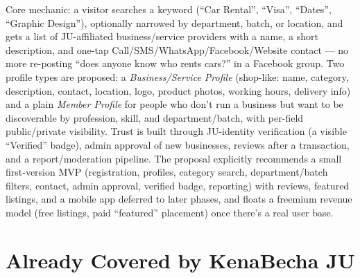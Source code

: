 \documentclass[11pt]{article}
\begin{document}
Core mechanic: a visitor searches a keyword (``Car Rental'', ``Visa'', ``Dates'', ``Graphic Design''), optionally narrowed by department, batch, or location, and gets a list of JU-affiliated business/service providers with a name, a short description, and one-tap Call/SMS/WhatsApp/Facebook/Website contact --- no more re-posting ``does anyone know who rents cars?'' in a Facebook group. Two profile types are proposed: a \emph{Business/Service Profile} (shop-like: name, category, description, contact, location, logo, product photos, working hours, delivery info) and a plain \emph{Member Profile} for people who don't run a business but want to be discoverable by profession, skill, and department/batch, with per-field public/private visibility. Trust is built through JU-identity verification (a visible ``Verified'' badge), admin approval of new businesses, reviews after a transaction, and a report/moderation pipeline. The proposal explicitly recommends a small first-version MVP (registration, profiles, category search, department/batch filters, contact, admin approval, verified badge, reporting) with reviews, featured listings, and a mobile app deferred to later phases, and floats a freemium revenue model (free listings, paid ``featured'' placement) once there's a real user base.

\section{Already Covered by KenaBecha JU}
\end{document}
